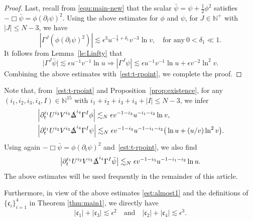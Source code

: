 \documentclass[a4paper,reqno]{amsart}
\theoremstyle{definition}
\numberwithin{equation}{section}
\def \pt{\partial_{t}}
\def\Deltas{\slashed{\Delta}}
\def\ep{\epsilon}
\begin{document}
\begin{proof}
\smallskip
Last, recall from \eqref{equ:main-new} that the scalar $\bar{\psi} = \psi + \frac{1}{2}\phi^2$ satisfies $-\Box \bar{\psi}=\phi(\pt \psi)^{2}$.
Using the above estimates for $\phi$ and $\psi$, for $J\in \mathbb{N}^{+}$ with $|J|\le N-3$, we have 
\begin{equation*}
   \left|  \Gamma^{J}\left(\phi(\pt \psi)^{2}\right)\right|\lesssim
   \epsilon^3 u^{-\frac{5}{2}+\delta_1}v^{-3}\ln v,\quad \mbox{for any}\ 0<\delta_{1}\ll 1.
\end{equation*}
It follows from Lemma~\ref{le:Linfty} that 
\begin{equation*}
    \big| \Gamma^{J}\bar{\psi}\big|\lesssim \epsilon u^{-1}v^{-1}\ln u\Longrightarrow 
    \left|\Gamma^{J}\psi\right|
\lesssim \epsilon u^{-1}v^{-1}\ln u + \epsilon v^{-2}\ln^{2} v.
\end{equation*}
Combining the above estimates with~\eqref{est:t-rpoint}, we complete the proof.
\end{proof}



Note that, from~\eqref{est:t-rpoint} and Proposition~\ref{prop:existence}, for any $(i_{1},i_{2},i_{3},i_{4},I)\in \mathbb{N}^{15}$ with $i_{1}+i_{2}+i_{3}+i_{4}+|I|\le N-3$, we infer
\begin{subequations}\label{est:almost1}
\begin{align}
    &\left| \partial_t^{i_{1}} U^{i_{2}}V^{i_{3}} \Deltas^{i_{4}} \Gamma^{I}\phi\right|\lesssim_{N} \epsilon v^{-1-i_{3}}u^{-i_{1}-i_{2}}\ln^{}v,\\
    &\left|\partial_t^{i_{1}} U^{i_{2}}V^{i_{3}} \Deltas^{i_{4}} \Gamma^{I}\psi\right|\lesssim_{N} \epsilon v^{-1-i_{3}}u^{-1-i_{1}-i_{2}}  { \big(\ln u + (u/v)\ln^{2} v\big)}.
    \end{align}
\end{subequations}
Using again $-\Box \bar{\psi} = \phi (\partial_t \psi)^2$ and~\eqref{est:t-rpoint}, we also find
\begin{equation}\label{est:almost2}
		\big|\partial_t^{i_{1}}U^{i_2} V^{i_3} \Deltas^{i_4} \Gamma^{I} \bar{\psi}\big|\\
        \lesssim_{N} \epsilon v^{-1-i_3} u^{-1-i_1-i_2} \ln u.
       \end{equation}
The above estimates will be used frequently in the remainder of this article.
  
Furthermore, in view of the above estimates \eqref{est:almost1} and the definitions of $\{\mathfrak{c}_i\}_{i=1}^{4}$ in Theorem \ref{thm:main1}, we directly have
\begin{equation}
\label{eq:roughboundofthepreciseconstants}
|\mathfrak{c}_1|+|\mathfrak{c}_3| \lesssim \ep^2\quad \mbox{and}\quad |\mathfrak{c}_2|+|\mathfrak{c}_4| \lesssim \ep^3.
\end{equation}
\end{document}
